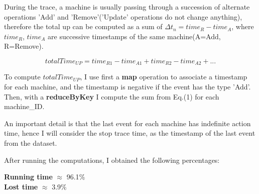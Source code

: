 \documentclass{article}
\begin{document}
During the trace, a machine is usually passing through a succession of alternate operations 'Add' and 'Remove'('Update' operations do not change anything), therefore the total up can be computed as a sum of $\Delta t_n=time_{R} - time_{A}$, where $time_{R}$, $time_{A}$ are successive timestamps of the same machine(A=Add, R=Remove).

\begin{equation}
	totalTime_{UP} = time_{R1} - time_{A1} + time_{R2} - time_{A2}+...
\end{equation}

To compute $totalTime_{UP}$, I use first a \textbf{map} operation to associate a timestamp for each machine, and the timestamp is negative if the event has the type 'Add'. Then, with a \textbf{reduceByKey} I compute the sum from Eq.(1) for each machine\_ID.

An important detail is that the last event for each machine has indefinite action time, hence I will consider the stop trace time, as the timestamp of the last event from the dataset.

After running the computations, I obtained the following percentages:

\textbf{Running time} $\approx$ 96.1$\%$\\
\textbf{Lost time} $\approx$ 3.9$\%$
\end{document}
